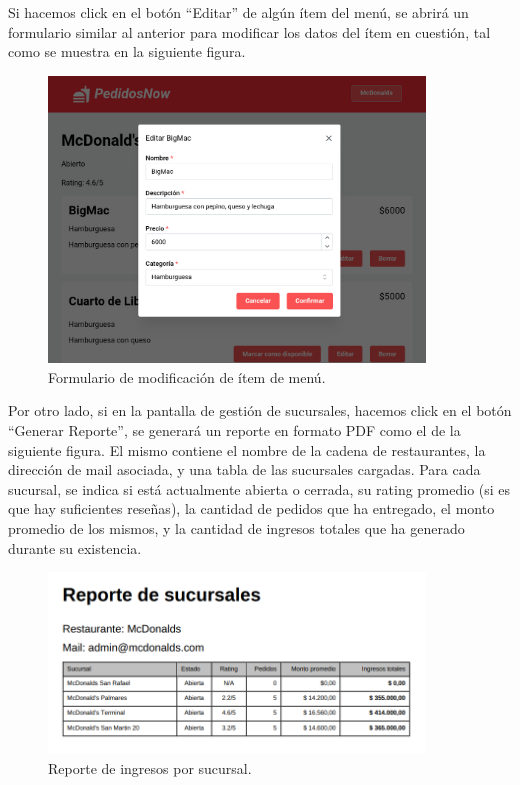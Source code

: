 Si hacemos click en el botón ``Editar'' de algún ítem del menú, se abrirá un formulario similar al anterior para modificar los datos del ítem en cuestión, tal como se muestra en la siguiente figura.

\begin{figure}[H]
    \centering
    \includegraphics[width=10cm]{./img/item-edit.png}
    \caption{Formulario de modificación de ítem de menú.}
\end{figure}

Por otro lado, si en la pantalla de gestión de sucursales, hacemos click en el botón ``Generar Reporte'', se generará un reporte en formato PDF como el de la siguiente figura. El mismo contiene el nombre de la cadena de restaurantes, la dirección de mail asociada, y una tabla de las sucursales cargadas. Para cada sucursal, se indica si está actualmente abierta o cerrada, su rating promedio (si es que hay suficientes reseñas), la cantidad de pedidos que ha entregado, el monto promedio de los mismos, y la cantidad de ingresos totales que ha generado durante su existencia.

\begin{figure}[H]
    \centering
    \includegraphics[width=10cm]{./img/report.png}
    \caption{Reporte de ingresos por sucursal.}
\end{figure}

